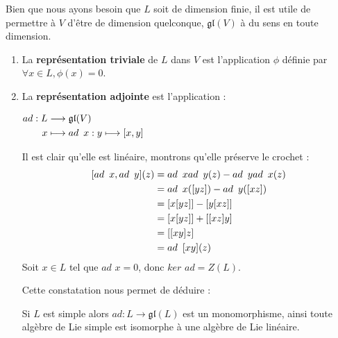 \documentclass[a4paper,openany,12pt]{report}
\newcommand{\gl}{\mathfrak{gl}}
\theoremstyle{break}
{\theorembodyfont{\upshape}
\newtheorem*{rmq}{Remarque :}
\newtheorem*{prv}{Preuve :}
\newtheorem*{ex}{Exemples :}
\newtheorem{exe}{Exemple : }
\newtheorem*{nota}{Notation :}}
\begin{document}
Bien que nous ayons besoin que $L$ soit de dimension finie, il est utile de permettre à $V$ d'être de dimension quelconque, $\gl(V)$ à du sens en toute dimension.
\begin{ex}
\begin{enumerate}

\item La \textbf{représentation triviale} de $L$ dans $V$ est l'application $\phi$ définie par $\forall x \in L , \phi(x)=0$.

\item La \textbf{représentation adjointe} est l'application :
\begin{center}
$
\begin{aligned}
ad : L & \longrightarrow \gl(V) \\
x & \longmapsto ad \enskip x : y\longmapsto [x,y]
\end{aligned}$
\end{center}
Il est clair qu'elle est linéaire, montrons qu'elle préserve le crochet :
\[
\begin{aligned}
[ad \enskip x, ad \enskip y](z) & = ad \enskip x ad \enskip y(z)- ad \enskip y ad \enskip x(z) \\
& = ad \enskip x([y z])-ad \enskip y([x z]) \\
& = [x[y z]]-[y[x z]] \\
& = [x[y z]]+[[x z] y] \\
& = [[x y] z] \\
& = ad \enskip [x y](z)
\end{aligned} \]
Soit $x \in L$ tel que $ad$ $x=0$, donc $ker$ $ad = Z(L)$. 

Cette constatation nous permet de déduire :

\quad Si $L$ est simple alors $ad: L \longrightarrow \gl(L)$ est un monomorphisme, ainsi toute algèbre de Lie simple est isomorphe à une algèbre de Lie linéaire.
\end{enumerate}
\end{ex}
\end{document}
